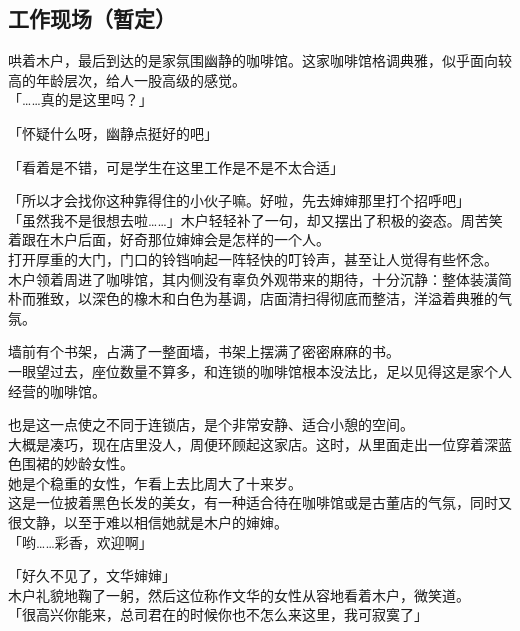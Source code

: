 \subsection{工作现场（暂定）}

哄着木户，最后到达的是家氛围幽静的咖啡馆。这家咖啡馆格调典雅，似乎面向较高的年龄层次，给人一股高级的感觉。\\

「……真的是这里吗？」

「怀疑什么呀，幽静点挺好的吧」

「看着是不错，可是学生在这里工作是不是不太合适」

「所以才会找你这种靠得住的小伙子嘛。好啦，先去婶婶那里打个招呼吧」\\

「虽然我不是很想去啦……」木户轻轻补了一句，却又摆出了积极的姿态。周苦笑着跟在木户后面，好奇那位婶婶会是怎样的一个人。\\

打开厚重的大门，门口的铃铛响起一阵轻快的叮铃声，甚至让人觉得有些怀念。\\

木户领着周进了咖啡馆，其内侧没有辜负外观带来的期待，十分沉静：整体装潢简朴而雅致，以深色的橡木和白色为基调，店面清扫得彻底而整洁，洋溢着典雅的气氛。

墙前有个书架，占满了一整面墙，书架上摆满了密密麻麻的书。\\

一眼望过去，座位数量不算多，和连锁的咖啡馆根本没法比，足以见得这是家个人经营的咖啡馆。

也是这一点使之不同于连锁店，是个非常安静、适合小憩的空间。\\

大概是凑巧，现在店里没人，周便环顾起这家店。这时，从里面走出一位穿着深蓝色围裙的妙龄女性。\\

她是个稳重的女性，乍看上去比周大了十来岁。\\

这是一位披着黑色长发的美女，有一种适合待在咖啡馆或是古董店的气氛，同时又很文静，以至于难以相信她就是木户的婶婶。\\

「哟……彩香，欢迎啊」

「好久不见了，文华婶婶」\\

木户礼貌地鞠了一躬，然后这位称作文华的女性从容地看着木户，微笑道。\\

「很高兴你能来，总司君在的时候你也不怎么来这里，我可寂寞了」


